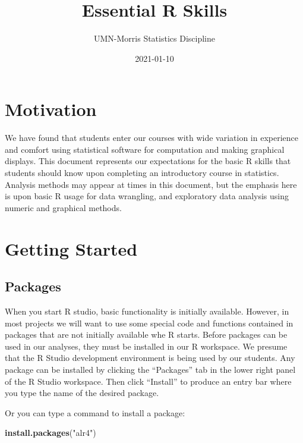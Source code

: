 \documentclass[
]{book}
\title{Essential R Skills}
\author{UMN-Morris Statistics Discipline}
\date{2021-01-10}
\newenvironment{Shaded}{\begin{snugshade}}{\end{snugshade}}
\newcommand{\KeywordTok}[1]{\textcolor[rgb]{0.13,0.29,0.53}{\textbf{#1}}}
\newcommand{\NormalTok}[1]{#1}
\newcommand{\StringTok}[1]{\textcolor[rgb]{0.31,0.60,0.02}{#1}}
\begin{document}
\maketitle

{
\setcounter{tocdepth}{1}
\tableofcontents
}
\hypertarget{motivation}{%
\chapter{Motivation}\label{motivation}}

We have found that students enter our courses with wide variation in experience and comfort using statistical software for computation and making graphical displays. This document represents our expectations for the basic R skills that students should know upon completing an introductory course in statistics. Analysis methods may appear at times in this document, but the emphasis here is upon basic R usage for data wrangling, and exploratory data analysis using numeric and graphical methods.

\hypertarget{GettingStarted}{%
\chapter{Getting Started}\label{GettingStarted}}

\hypertarget{packages}{%
\section{Packages}\label{packages}}

When you start R studio, basic functionality is initially available. However, in most projects we will want to use some special code and functions contained in packages that are not initially available whe R starts. Before packages can be used in our analyses, they must be installed in our R workspace. We presume that the R Studio development environment is being used by our students. Any package can be installed by clicking the ``Packages'' tab in the lower right panel of the R Studio workspace. Then click ``Install'' to produce an entry bar where you type the name of the desired package.

Or you can type a command to install a package:

\begin{Shaded}
\begin{Highlighting}[]
\KeywordTok{install.packages}\NormalTok{(}\StringTok{"alr4"}\NormalTok{)}
\end{Highlighting}
\end{Shaded}
\end{document}
